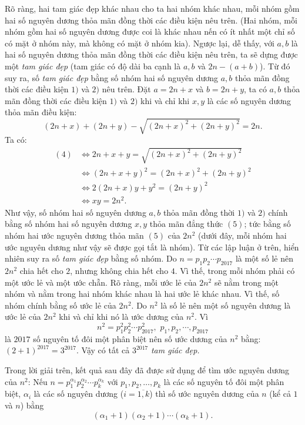 \begin{bt}
{	Rõ ràng, hai tam giác đẹp khác nhau cho ta hai nhóm khác nhau, mỗi nhóm gồm hai số nguyên dương thỏa mãn đồng thời các điều kiện nêu trên. (Hai nhóm, mỗi nhóm gồm hai số nguyên dương được coi là khác nhau nến có ít nhất một chỉ số có mặt ở nhóm này, mà không có mặt ở nhóm kia).
	Ngược lại, dễ thấy, với $a,b$ là hai số nguyên dương thỏa mãn đồng thời các điều kiện nêu trên, ta sẽ dựng được một \textit{tam giác đẹp} (tam giác có độ dài ba cạnh là $a,b$ và $2n-(a+b)$).
	Từ đó suy ra, số \textit{tam giác đẹp} bằng số nhóm hai số nguyên dương $a,b$ thỏa mãn đồng thời các điều kiện $1)$ và $2)$ nêu trên.
	Đặt $a=2n+x$ và $b=2n+y$, ta có $a,b$ thỏa mãn đồng thời các điều kiện $1)$ và $2)$ khi và chỉ khi $x,y$ là các số nguyên dương thỏa mãn điều kiện: 
	\[(2n+x)+(2n+y)-\sqrt{(2n+x)^2+(2n+y)^2}=2n.\tag{4}\]
	Ta có: 
	{\allowdisplaybreaks \begin{align*}
			(4)&\Leftrightarrow 2n+x+y=\sqrt{(2n+x)^2+(2n+y)^2}\\ &\Leftrightarrow \left(2n+x+y\right)^2=(2n+x)^2+(2n+y)^2 \\ &\Leftrightarrow 2(2n+x)y+y^2=(2n+y)^2\\
			&\Leftrightarrow xy=2n^2.\tag{5}
			\end{align*}}Như vậy, số nhóm hai số nguyên dương $a,b$ thỏa mãn đồng thời $1)$ và $2)$ chính bằng số nhóm hai số nguyên dương $x,y$ thỏa mãn đẳng thức $(5)$; tức bằng số nhóm hai ước nguyên dương thỏa mãn $(5)$ của $2n^2$ (dưới đây, mỗi nhóm hai ước nguyên dương như vậy sẽ được gọi tắt là nhóm).
	Từ các lập luận ở trên, hiển nhiên suy ra số \textit{tam giác đẹp} bằng số nhóm.
Do $n=p_1p_2\cdots p_{2017}$ là một số lẻ nên $2n^2$ chia hết cho $2$, nhưng không chia hết cho $4$. Vì thế, trong mỗi nhóm phải có một ước lẻ và một ước chẵn.
	Rõ ràng, mỗi ước lẻ của $2n^2$ sẽ nằm trong một nhóm và nằm trong hai nhóm khác nhau là hai ước lẻ khác nhau. Vì thế, số nhóm chính bằng số ước lẻ của $2n^2$. 
	Do $n^2$ là số lẻ nên một số nguyên dương là ước lẻ của $2n^2$ khi và chỉ khi nó là ước dương của $n^2$.
	Vì 
	$$n^2=p_1^2p_2^2\cdots p_{2017}^2,\,\, p_1,p_2,\cdots ,p_{2017}$$
	là $2017$ số nguyên tố đôi một phân biệt nên số ước dương của $n^2$ bằng: $(2+1)^{2017}=3^{2017}$.
	Vậy có tất cả $3^{2017}$ \textit{tam giác đẹp.}
\begin{nx} Trong lời giải trên, kết quả sau đây đã được sử dụng để tìm ước nguyên dương của $n^2$:
		Nếu $n=p_1^{\alpha_1}p_2^{\alpha_2}\cdots p_k^{\alpha_k}$ với $p_1,p_2,\dots,p_k$ là các số nguyên tố đôi một phân biệt, $\alpha_i$ là các số nguyên dương ($i=\overline{1,k}$) thì số ước nguyên dương của $n$ (kể cả $1$ và $n$) bằng $$\left(\alpha_1+1\right)\left(\alpha_2+1\right)\cdots\left(\alpha_k+1\right).$$
	\end{nx}
}
\end{bt}


